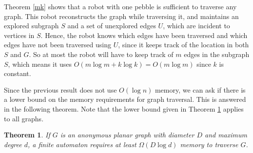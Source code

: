\documentclass[12pt,letterpaper,oneside]{book}
\newtheorem{theorem}{Theorem}[section]
\begin{document}
Theorem \ref{mk} shows that a robot with one pebble 
is sufficient to traverse any graph.  This robot reconstructs the graph while traversing it, and maintains an 
explored subgraph $S$ and a set of unexplored edges $U$, which are incident to vertices in $S$.  Hence, the robot 
knows which edges have been traversed and which edges have not been traversed using $U$, since it keeps track of the location in both 
$S$ and $G$.  So at most the robot will have to keep track of $m$ edges in the 
subgraph $S$, which means it uses $O(m\log m+k\log k)=O(m\log m)$ since 
$k$ is constant.

Since the previous result does not use $O(\log n)$ memory, we can ask if there is a lower bound on the memory 
requirements for graph traversal.  This is answered in the following theorem.  
Note that the lower bound given in Theorem \ref{lb} applies to all graphs.  

\begin{theorem}\label{lb}
\emph{\cite{FIPPP}} If $G$ is an anonymous 
planar graph with diameter $D$ and maximum degree $d$, a finite automaton requires at least $\Omega(D\log d)$ memory 
to traverse $G$.  
\end{theorem}





\end{document}
